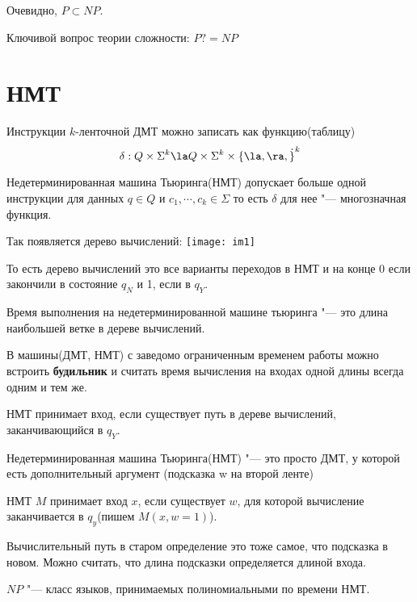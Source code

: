 Очевидно, $P \subset NP$.

\begin{Rem}
Ключивой вопрос теории сложности: $P ?= NP$
\end{Rem}

\section{НМТ}
Инструкции $k$-ленточной ДМТ можно записать как
функцию(таблицу)
$$\delta: Q \times \Sigma^k \la Q \times \Sigma^k 
\times \{\la, \ra, \dot\}^k$$
\begin{Def}
Недетерминированная машина Тьюринга(НМТ)
допускает больше одной инструкции для данных
$q \in Q$ и $c_1, \cdots, c_k \in \Sigma$ то есть
$\delta$ для нее "--- многозначная функция.
\end{Def}

Так появляется дерево вычислений:
\texttt{[image: im1]}

То есть дерево вычислений это все варианты переходов в НМТ и
на конце 0 если закончили в состояние $q_N$ и 1, если в $q_Y$. 

\begin{Def}
Время выполнения на недетерминированной машине тьюринга "--- это 
длина наибольшей ветке в дереве вычислений. 
\end{Def}

\begin{Def}
В машины(ДМТ, НМТ) с заведомо ограниченным
временем работы можно встроить \textbf{будильник} и считать 
время вычисления на входах одной 
длины всегда одним и тем же. 

НМТ принимает вход, если существует 
путь в дереве вычислений, заканчивающийся в $q_Y$.
\end{Def}

\begin{Def}
Недетерминированная машина Тьюринга(НМТ) "--- это просто ДМТ,
у которой есть дополнительный аргумент (подсказка w на второй ленте)

НМТ $M$ принимает вход $x$, если существует $w$, для которой 
вычисление заканчивается в $q_y$(пишем $M(x, w = 1)$).\\
\end{Def}

Вычислительный путь в старом определение это тоже
самое, что подсказка в новом. Можно считать, что 
длина подсказки определяется длиной входа. 

\begin{Def}
$NP$ "--- класс языков, принимаемых полиномиальными 
по времени НМТ.
\end{Def}
